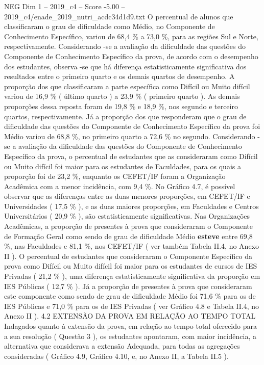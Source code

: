 \begin{textsample}{NEG Dim 1 – 2019\_c4 – Score -5.00 – 2019\_c4/enade\_2019\_nutri\_acdc34d1d9.txt}
O percentual de alunos que classificaram o grau de dificuldade como Médio, no Componente de Conhecimento Específico, variou de 68,4 \% a 73,0 \%, para as regiões Sul e Norte, respectivamente.
Considerando -se a avaliação da dificuldade das questões do Componente de Conhecimento Específico da prova, de acordo com o desempenho dos estudantes, observa -se que há diferença estatisticamente significativa dos resultados entre o primeiro quarto e os demais quartos de desempenho.
A proporção dos que classificaram a parte específica como Difícil ou Muito difícil variou de 16,9 \% ( último quarto ) a 23,9 \% ( primeiro quarto ).
As demais proporções dessa reposta foram de 19,8 \% e 18,9 \%, nos segundo e terceiro quartos, respectivamente.
Já a proporção dos que responderam que o grau de dificuldade das questões do Componente de Conhecimento Específico da prova foi Médio variou de 68,8 \%, no primeiro quarto a 72,6 \% no segundo.
Considerando -se a avaliação da dificuldade das questões do Componente de Conhecimento Específico da prova, o percentual de estudantes que as consideraram como Difícil ou Muito difícil foi maior para os estudantes de Faculdades, para os quais a proporção foi de 23,2 \%, enquanto os CEFET/IF foram a Organização Acadêmica com a menor incidência, com 9,4 \%.
No Gráfico 4.7, é possível observar que as diferenças entre as duas menores proporções, em CEFET/IF e Universidades ( 17,5 \% ), e as duas maiores proporções, em Faculdades e Centros Universitários ( 20,9 \% ), são estatisticamente significativas.
Nas Organizações Acadêmicas, a proporção de presentes à prova que consideraram o Componente de Formação Geral como sendo de grau de dificuldade Médio \textbf{esteve} entre 69,8 \%, nas Faculdades e 81,1 \%, nos CEFET/IF ( ver também Tabela II.4, no Anexo II ).
O percentual de estudantes que consideraram o Componente Específico da prova como Difícil ou Muito difícil foi maior para os estudantes de cursos de IES Privadas ( 21,2 \% ), uma diferença estatisticamente significativa da proporção em IES Públicas ( 12,7 \% ).
Já a proporção de presentes à prova que consideraram este componente como sendo de grau de dificuldade Médio foi 71,6 \% para os de IES Públicas e 71,0 \% para os de IES Privadas ( ver Gráfico 4.8 e Tabela II.4, no Anexo II ). 4.2 EXTENSÃO DA PROVA EM RELAÇÃO AO TEMPO TOTAL Indagados quanto à extensão da prova, em relação ao tempo total oferecido para a sua resolução ( Questão 3 ), os estudantes apontaram, com maior incidência, a alternativa que considerava a extensão Adequada, para todas as agregações consideradas ( Gráfico 4.9, Gráfico 4.10, e, no Anexo II, a Tabela II.5 ).

\end{textsample}
